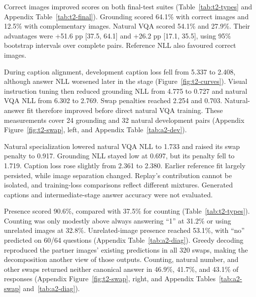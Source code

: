 \documentclass{article}
\begin{document}
\begin{table}[t]
\centering\small
\resizebox{\linewidth}{!}{}
\caption{Visual-language resource use on a Tesla T4. Training times cover update steps and exclude development evaluation and checkpoint saving. Evaluation timings use cached features and batch size eight. Memory values report peak allocated GPU memory.}
\label{tab:t2-res}
\end{table}

Correct images improved scores on both final-test suites (Table~\ref{tab:t2-types} and Appendix Table~\ref{tab:t2-final}). Grounding scored 64.1\% with correct images and 12.5\% with complementary images. Natural VQA scored 54.1\% and 27.9\%. Their advantages were +51.6 pp [37.5, 64.1] and +26.2 pp [17.1, 35.5], using 95\% bootstrap intervals over complete pairs. Reference NLL also favoured correct images.

During caption alignment, development caption loss fell from 5.337 to 2.408, although answer NLL worsened later in the stage (Figure~\ref{fig:t2-curves}). Visual instruction tuning then reduced grounding NLL from 4.775 to 0.727 and natural VQA NLL from 6.302 to 2.769. Swap penalties reached 2.254 and 0.703. Natural-answer fit therefore improved before direct natural VQA training. These measurements cover 24 grounding and 32 natural development pairs (Appendix Figure~\ref{fig:t2-swap}, left, and Appendix Table~\ref{tab:a2-dev}).

Natural specialization lowered natural VQA NLL to 1.733 and raised its swap penalty to 0.917. Grounding NLL stayed low at 0.697, but its penalty fell to 1.719. Caption loss rose slightly from 2.361 to 2.380. Earlier reference fit largely persisted, while image separation changed. Replay's contribution cannot be isolated, and training-loss comparisons reflect different mixtures. Generated captions and intermediate-stage answer accuracy were not evaluated.

Presence scored 90.6\%, compared with 37.5\% for counting (Table~\ref{tab:t2-types}). Counting was only modestly above always answering ``1'' at 31.2\% or using unrelated images at 32.8\%. Unrelated-image presence reached 53.1\%, with ``no'' predicted on 60/64 questions (Appendix Table~\ref{tab:a2-diag}). Greedy decoding reproduced the partner images' existing predictions in all 320 swaps, making the decomposition another view of those outputs. Counting, natural number, and other swaps returned neither canonical answer in 46.9\%, 41.7\%, and 43.1\% of responses (Appendix Figure~\ref{fig:t2-swap}, right, and Appendix Tables~\ref{tab:a2-swap} and~\ref{tab:a2-diag}).
\end{document}
